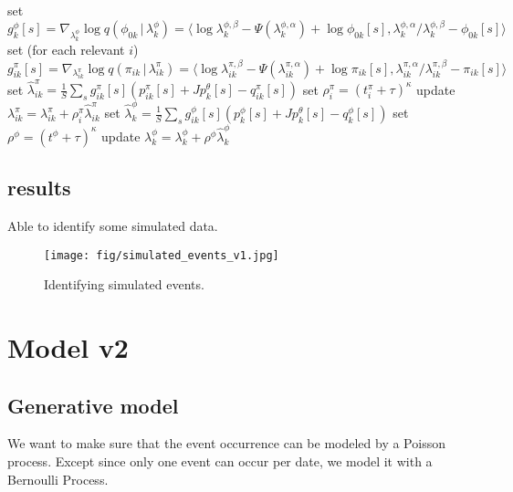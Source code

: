 \documentclass{article}
\newcommand{\g}{\, | \,}
\begin{document}
\begin{algorithm}[h]
\begin{algorithmic}[1]
			\State set $g^\phi_k[s] = \nabla_{\lambda^\phi_{k}} \log q(\phi_{0k} \g \lambda^\phi_{k}) = \langle \log \lambda^{\phi,\beta}_k - \Psi( \lambda^{\phi,\alpha}_k) + \log \phi_{0k}[s], \lambda^{\phi,\alpha}_k / \lambda^{\phi,\beta}_k - \phi_{0k}[s] \rangle$ 
			\State set (for each relevant $i$) $g^\pi_{ik}[s] = \nabla_{\lambda^\pi_{ik}} \log q(\pi_{ik} \g \lambda^\pi_{ik}) = \langle \log \lambda^{\pi,\beta}_{ik} - \Psi(\lambda^{\pi,\alpha}_{ik}) + \log \pi_{ik}[s], \lambda^{\pi,\alpha}_{ik}  / \lambda^{\pi,\beta}_{ik} - \pi_{ik}[s] \rangle$
		\EndFor
	\EndFor
	\For {each event $i$ on date $a_i \in \left( c_j - d, c_j \right]$}
		\State set $\hat\lambda^{\pi}_{ik} = \frac{1}{S}\sum_s g^\pi_{ik}[s] ( p^\pi_{ik}[s] + J p^\theta_k[s] -  q^\pi_{ik}[s] ) $
		\State set $\rho^\pi_i = (t^\pi_i + \tau)^\kappa$
		\State update $\lambda^{\pi}_{ik} = \lambda^{\pi}_{ik} + \rho^\pi_i \hat\lambda^{\pi}_{ik} $
	\EndFor
	\State set $\hat\lambda^{\phi}_{k} = \frac{1}{S}\sum_s g^\phi_{ik}[s] ( p^\phi_{k}[s] + J p^\theta_k[s] -  q^\phi_{k}[s] ) $
	\State set $\rho^\phi = (t^\phi +\tau)^\kappa$
	\State update $\lambda^{\phi}_{k} = \lambda^{\phi}_{k} + \rho^\phi \hat\lambda^{\phi}_{k}$
\end{algorithmic}
\end{algorithm}

\subsection{results}
Able to identify some simulated data.
\begin{figure}[ht]
  \begin{center}
    \texttt{[image: fig/simulated\_events\_v1.jpg]}
  \end{center}
  \caption{Identifying simulated events.}
  \label{fig:sim1}
 \end{figure}



\section{Model v2}
\subsection{Generative model}
We want to make sure that the event occurrence can be modeled by a Poisson process.  Except since only one event can occur per date, we model it with a Bernoulli Process.
\end{document}

